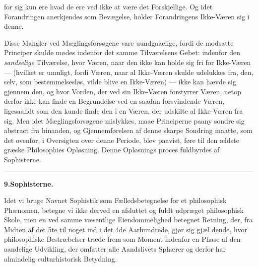 \documentclass[12pt,a4paper]{book}
\newcommand{\divrule}{\begin{center}\rule{2cm}{0.4pt}\end{center}}
\begin{document}
for sig kun ere hvad de ere ved ikke at være det Forskjellige.
%
%
%
%
Og idet Forandringen anerkjendes som Bevægelse, holder
Forandringens Ikke-Væren sig i denne.

Disse Mangler ved Mæglingsforsøgene vare uundgaaelige,
fordi de modsatte Principer skulde mødes indenfor det samme
Tilværelsens Gebet: indenfor den \emph{sandselige} Tilværelse,
hvor Væren, naar den ikke kan holde sig fri for Ikke-Væren
--- (hvilket er umuligt, fordi Væren, naar al Ikke-Væren skulde
udelukkes fra, den, selv, som bestemmelsesløs, vilde blive en
Ikke-Væren) --- ikke kan hævde sig gjennem den, og hvor
Vorden, der ved sin Ikke-Væren forstyrrer Væren, netop derfor
ikke kan finde en Begrundelse ved en saadan forsvindende Væren,
ligesaalidt som den kunde finde den i en Væren, der udskilte al
Ikke-Væren fra sig. Men idet Mæglingsforsøgene mislykkes,
maae Principerne paany sondre sig abstract fra hinanden, og
Gjennemførelsen af denne skarpe Sondring maatte, som det
ovenfor, i Oversigten over denne Periode, blev paavist, føre til
den ældste græske Philosophies Opløsning. Denne Opløsnings\-%
proces fuldbyrdes af Sophisterne.

\divrule

\begin{center}
\textbf{9.\enspace Sophisterne.}
\end{center}
Idet vi bruge Navnet Sophistik som Fælledsbetegnelse for
et philosophisk Phænomen, betegne vi ikke derved en afsluttet
og fuldt udpræget philosophisk Skole, men en ved samme
væsentlige Eiendommelighed betegnet Retning, der, fra Midten
af det 5te til noget ind i det 4de Aarhundrede, gjør sig gjæl\-%
dende, hvor philosophiske Bestræbelser træde frem som Moment
indenfor en Phase af den aandelige Udvikling, der omfatter
alle Aandslivets Sphærer og derfor har almindelig culturhistorisk
Betydning.
\end{document}
